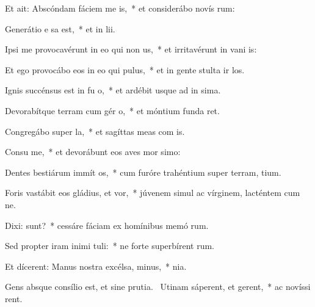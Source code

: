 \item Et ait: Abscóndam fáciem me  is,~* et considerábo novís rum:
\item Generátio e sa est,~* et in lii.
\item Ipsi me provocavérunt in eo qui non  us,~* et irritavérunt in vani is:
\item Et ego provocábo eos in eo qui   pulus,~* et in gente stulta ir los.
\item Ignis succénsus est in fu o,~* et ardébit usque ad in sima.
\item Devorabítque terram cum gér o,~* et móntium funda ret.
\item Congregábo super  la,~* et sagíttas meas com  is.
\item Consu me,~* et devorábunt eos aves mor simo:
\item Dentes bestiárum immít  os,~* cum furóre trahéntium super terram,  tium.
\item Foris vastábit eos gládius, et  vor,~* júvenem simul ac vírginem, lacténtem cum  ne.
\item Dixi:  sunt?~* cessáre fáciam ex homínibus memó rum.
\item Sed propter iram inimi tuli:~* ne forte superbírent  rum.
\item Et dícerent: Manus nostra excélsa,   minus,~*   nia.
\item Gens absque consílio est, et sine prutia.~\pscross{} Utinam sáperent, et gerent,~* ac novíssi rent.

